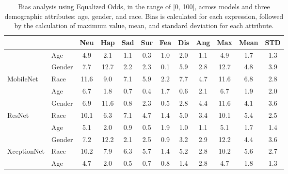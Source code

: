 \begin{table}[t] 
\caption{Bias analysis using Equalized Odds, in the range of [0, 100], across models and three demographic attributes: age, gender, and race. Bias is calculated for each expression, followed by the calculation of maximum value, mean, and standard deviation for each attribute.}
\label{tbl:bias_equalized_odds}
\centering
\small
\setlength{\tabcolsep}{3pt} %
\resizebox{0.96\linewidth}{!}
{
\begin{tabular}{ll|>{\color{mediumgray}}c>{\color{mediumgray}}c>{\color{mediumgray}}c>{\color{mediumgray}}c>{\color{mediumgray}}c>{\color{mediumgray}}c>{\color{mediumgray}}c|ccc}
                                                   &        & \color{black}Neu & \color{black}Hap & \color{black}Sad 
                                                            & \color{black}Sur & \color{black}Fea & \color{black}Dis 
                                                            & \color{black}Ang & Max & Mean & STD \\ \hline
\multicolumn{1}{l|}{}                              & Age    & 4.9 & 2.1 & 1.1 & 0.3 & 1.0 & 2.0 & 1.1 & 4.9 & 1.7 & 1.3 \\
\multicolumn{1}{l|}{}                              & Gender & 7.7 & 12.7 & 2.2 & 2.3 & 0.1 & 5.9 & 2.8 & 12.7 & 4.8 & 3.9 \\
\multicolumn{1}{l|}{\multirow{-3}{*}{MobileNet}}   & Race   & 11.6 & 9.0 & 7.1 & 5.9 & 2.2 & 7.7 & 4.7 & 11.6 & 6.8 & 2.8 \\ \hline
\multicolumn{1}{l|}{}                              & Age    & 6.7 & 1.8 & 0.7 & 0.4 & 1.7 & 0.6 & 2.1 & 6.7 & 1.9 & 2.0 \\
\multicolumn{1}{l|}{}                              & Gender & 6.9 & 11.6 & 0.8 & 2.3 & 0.5 & 2.8 & 4.4 & 11.6 & 4.1 & 3.6 \\
\multicolumn{1}{l|}{\multirow{-3}{*}{ResNet}}      & Race   & 10.1 & 6.3 & 7.1 & 4.7 & 1.4 & 5.0 & 3.4 & 10.1 & 5.4 & 2.5 \\ \hline
\multicolumn{1}{l|}{}                              & Age    & 5.1 & 2.0 & 0.9 & 0.5 & 1.9 & 1.0 & 1.1 & 5.1 & 1.7 & 1.4 \\
\multicolumn{1}{l|}{}                              & Gender & 7.2 & 12.2 & 2.1 & 2.5 & 0.9 & 3.2 & 2.9 & 12.2 & 4.4 & 3.6 \\
\multicolumn{1}{l|}{\multirow{-3}{*}{XceptionNet}} & Race   & 10.2 & 7.9 & 6.3 & 5.7 & 1.4 & 5.2 & 2.8 & 10.2 & 5.6 & 2.7 \\ \hline
\multicolumn{1}{l|}{}                              & Age    & 4.7 & 2.0 & 0.5 & 0.7 & 0.8 & 1.4 & 2.8 & 4.7 & 1.8 & 1.3 \\

\end{tabular}}
\end{table}
